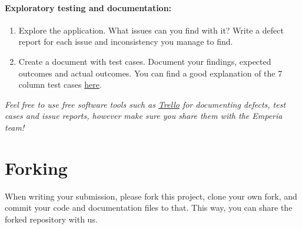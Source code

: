 \documentclass[12pt]{article}
\begin{document}
    \paragraph{Exploratory testing and documentation:}
	\begin{enumerate}
				\item Explore the application. What issues can you find with it? Write a defect report for each issue and inconsistency you manage to find. 
				 \item Create a document with test cases. Document your findings, expected outcomes and actual outcomes. You can find a good explanation of the 7 column test cases   \href{https://www.freecodecamp.org/news/how-to-write-qa-documentation-that-will-work}{here}.
	\end{enumerate}
    \textit{Feel free to use free software tools such as \href{https://trello.com/}{Trello} for documenting defects, test cases and issue reports, however make sure you share them with the Emperia team!}
    
\section{Forking}
When writing your submission, please fork this project, clone your own fork, and commit your code and documentation files to that. This way, you can share the forked repository with us.
\end{document}
